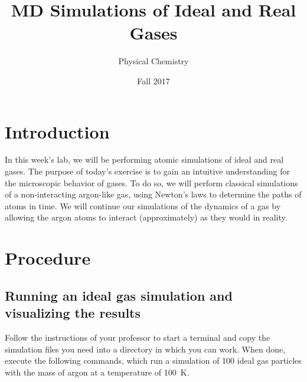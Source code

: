 \documentclass[10pt]{article}
\title{MD Simulations of Ideal and Real Gases}
\author{Physical Chemistry}
\date{Fall 2017}
\begin{document}
\maketitle
\begin{fullwidth}
  \tableofcontents
\end{fullwidth}

\section{Introduction}
In this week's lab, we will be performing atomic simulations of ideal and real gases.
The purpose of today's exercise is to gain an intuitive understanding for the microscopic behavior of gases. 
To do so, we will perform classical simulations of a non-interacting argon-like gas, using Newton's laws to determine the paths of atoms in time.
We will continue our simulations of the dynamics of a gas by allowing the argon atoms to interact (approximately) as they would in reality.

\section{Procedure}

  \subsection{Running an ideal gas simulation and visualizing the results}
  \label{sec:ideal-gas}
  Follow the instructions of your professor to start a terminal and copy the simulation files you need into a directory in which you can work.
  When done, execute the following commands, which run a simulation of 100 ideal gas particles with the mass of argon at a temperature of 100~K.
\end{document}
